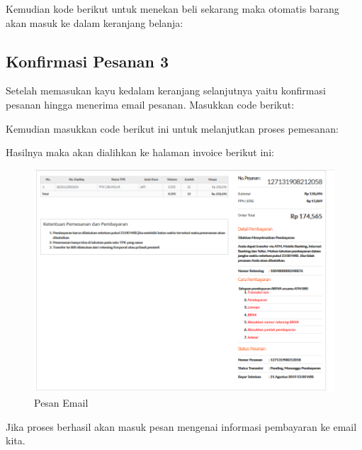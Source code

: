Kemudian kode berikut untuk menekan beli sekarang maka otomatis barang akan masuk ke dalam keranjang belanja:


\newpage
\subsection{Konfirmasi Pesanan 3}
Setelah memasukan kayu kedalam keranjang selanjutnya yaitu konfirmasi pesanan hingga menerima email pesanan. 
Masukkan code berikut:


Kemudian masukkan code berikut ini untuk melanjutkan proses pemesanan:


Hasilnya maka akan dialihkan ke halaman invoice berikut ini:
\begin{figure}[h]
	\centering
	\includegraphics[scale=0.30]{figures/6invoice}
	\caption{Pesan Email}
\end{figure}

Jika proses berhasil akan masuk pesan mengenai informasi pembayaran ke email kita.

\newpage 

